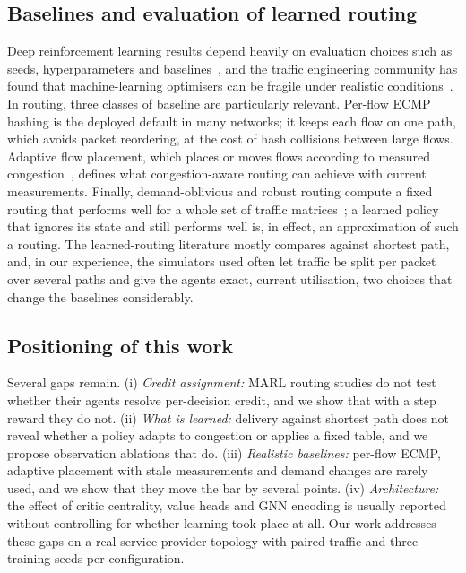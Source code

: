 \documentclass[10pt,journal,comsoc]{IEEEtran}
\begin{document}
\subsection{Baselines and evaluation of learned routing}
Deep reinforcement learning results depend heavily on evaluation choices such as seeds, hyperparameters and baselines~\cite{henderson2018deep}, and the traffic engineering community has found that machine-learning optimisers can be fragile under realistic conditions~\cite{bernardez2021machine}. In routing, three classes of baseline are particularly relevant. Per-flow ECMP hashing is the deployed default in many networks; it keeps each flow on one path, which avoids packet reordering, at the cost of hash collisions between large flows. Adaptive flow placement, which places or moves flows according to measured congestion~\cite{alfares2010hedera,alizadeh2014conga}, defines what congestion-aware routing can achieve with current measurements. Finally, demand-oblivious and robust routing compute a fixed routing that performs well for a whole set of traffic matrices~\cite{applegate2003making,azar2003optimal}; a learned policy that ignores its state and still performs well is, in effect, an approximation of such a routing. The learned-routing literature mostly compares against shortest path, and, in our experience, the simulators used often let traffic be split per packet over several paths and give the agents exact, current utilisation, two choices that change the baselines considerably.

\subsection{Positioning of this work}
Several gaps remain. (i) \emph{Credit assignment:} MARL routing studies do not test whether their agents resolve per-decision credit, and we show that with a step reward they do not. (ii) \emph{What is learned:} delivery against shortest path does not reveal whether a policy adapts to congestion or applies a fixed table, and we propose observation ablations that do. (iii) \emph{Realistic baselines:} per-flow ECMP, adaptive placement with stale measurements and demand changes are rarely used, and we show that they move the bar by several points. (iv) \emph{Architecture:} the effect of critic centrality, value heads and GNN encoding is usually reported without controlling for whether learning took place at all. Our work addresses these gaps on a real service-provider topology with paired traffic and three training seeds per configuration.
\end{document}

